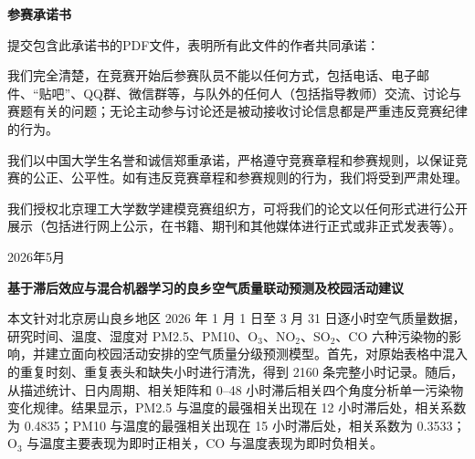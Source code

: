 \documentclass[UTF8,a4paper,12pt]{ctexart}
\begin{document}
\begin{titlepage}
\thispagestyle{empty}
\begin{center}
    {\bfseries 参赛承诺书\par}
    \vspace{2cm}
    \begin{minipage}{0.88\textwidth}
    \linespread{1.5}\selectfont
    提交包含此承诺书的PDF文件，表明所有此文件的作者共同承诺：

    \vspace{1em}
    我们完全清楚，在竞赛开始后参赛队员不能以任何方式，包括电话、电子邮件、“贴吧”、QQ群、微信群等，与队外的任何人（包括指导教师）交流、讨论与赛题有关的问题；无论主动参与讨论还是被动接收讨论信息都是严重违反竞赛纪律的行为。

    \vspace{1em}
    我们以中国大学生名誉和诚信郑重承诺，严格遵守竞赛章程和参赛规则，以保证竞赛的公正、公平性。如有违反竞赛章程和参赛规则的行为，我们将受到严肃处理。

    \vspace{1em}
    我们授权北京理工大学数学建模竞赛组织方，可将我们的论文以任何形式进行公开展示（包括进行网上公示，在书籍、期刊和其他媒体进行正式或非正式发表等）。
    \end{minipage}
    \vfill
    { 2026年5月\par}
\end{center}
\end{titlepage}

\clearpage
{}
\setcounter{page}{1}

\begin{center}
{\bfseries 基于滞后效应与混合机器学习的良乡空气质量联动预测及校园活动建议\par}
\end{center}

\vspace{1.0em}
本文针对北京房山良乡地区 2026 年 1 月 1 日至 3 月 31 日逐小时空气质量数据，研究时间、温度、湿度对 PM2.5、PM10、O$_3$、NO$_2$、SO$_2$、CO 六种污染物的影响，并建立面向校园活动安排的空气质量分级预测模型。首先，对原始表格中混入的重复时刻、重复表头和缺失小时进行清洗，得到 2160 条完整小时记录。随后，从描述统计、日内周期、相关矩阵和 0--48 小时滞后相关四个角度分析单一污染物变化规律。结果显示，PM2.5 与温度的最强相关出现在 12 小时滞后处，相关系数为 0.4835；PM10 与温度的最强相关出现在 15 小时滞后处，相关系数为 0.3533；O$_3$ 与温度主要表现为即时正相关，CO 与温度表现为即时负相关。
\end{document}
